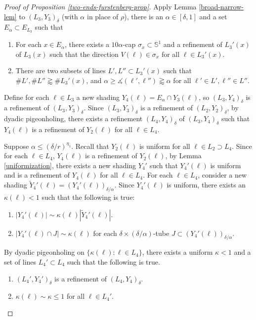 \documentclass{amsart}
\numberwithin{equation}{section}
\newcommand{\al}{\alpha}
\newcommand{\de}{\delta}
\newcommand{\si}{\sigma}
\newcommand{\ZS}{\mathbb{S}}
\newcommand{\ang}{\measuredangle}
\begin{document}
\begin{proof}[Proof of Proposition \ref{two-ends-furstenberg-prop}]
\medskip






Apply Lemma \ref{broad-narrow-lem} to $(L_3, Y_3)_\de$ (with $\al$ in place of $\rho$), there is an $\al\in[\de,1]$ and a set $E_\al\subset E_{L_3}$ such that
\begin{enumerate}
    \item For each $x\in E_\al$, there exists a $10\al$-cap $\si_x\subset\ZS^1$ and a refinement of $L_3'(x)$ of $L_3(x)$ such that the direction $V(\ell)\in \si_x$ for all $\ell\in L_3'(x)$.
    \item There are two subsets of lines $L', L''\subset L_3'(x)$ such that $\# L', \# L''\gtrapprox \# L_3'(x)$, and $\al\geq\ang(\ell',\ell'')\gtrapprox \al$ for all $\ell'\in L',\ell''\in L''$.
\end{enumerate}
Define for each $\ell\in L_3$ a new shading $Y_4(\ell)=E_\al\cap Y_3(\ell)$, so $(L_3, Y_4)_\de$ is a refinement of $(L_3, Y_3)_\de$. 
Since $(L_3, Y_3)_\de$ is a refinement of $(L_2, Y_2)_\de$, by dyadic pigeonholing, there exists a refinement $(L_4, Y_4)_\de$ of $(L_3, Y_4)_\de$ such that $Y_4(\ell)$ is a refinement of $Y_2(\ell)$ for all $\ell\in L_4$. 



\smallskip

Suppose $\al\leq (\de/r)^{\eta_1}$. 
Recall that $Y_2(\ell)$ is uniform for all $\ell\in L_2\supset L_4$.
Since for each $\ell\in L_4$, $Y_4(\ell)$ is a refinement of $Y_2(\ell)$, by Lemma \ref{uniformization}, there exists a new shading $Y_4'$ such that $Y_4'(\ell)$ is uniform and is a refinement of $Y_4(\ell)$ for all $\ell\in L_4$. 
For each $\ell\in L_4$, consider a new shading $\tilde Y_4'(\ell)=(Y_4'(\ell))_{\de/\al}$.
Since $Y_4'(\ell)$ is uniform, there exists an $\kappa(\ell)<1$ such that the following is true:
\begin{enumerate}
    \item $|Y_4'(\ell)|\sim \kappa(\ell)|\tilde Y_4'(\ell)|$.
    \item $|Y_4'(\ell)\cap J|\sim \kappa(\ell)$ for each $\de\times (\de/\al)$-tube $J\subset (Y_4'(\ell))_{\de/\al}$.
\end{enumerate}
By dyadic pigeonholing on $\{\kappa(\ell): \ell\in L_4\}$, there exists a uniform $\kappa<1$ and a set of lines $L_4'\subset L_4$ such that the following is true. 
\begin{enumerate}
    \item $(L_4',Y_4')_\de$ is a refinement of $(L_4,Y_4)_\de$.
    \item $\kappa(\ell)\sim \kappa \leq 1$ for all $\ell\in L_4'$.
\end{enumerate}



\end{proof}
\end{document}
